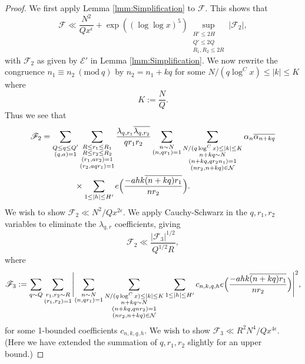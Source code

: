 \documentclass[10pt]{amsart}
\theoremstyle{plain}
\numberwithin{equation}{section}
\newcommand{\Mod}[1]{\ (\mathrm{mod}\ #1)}
\begin{document}
\begin{proof}
We first apply Lemma \ref{lmm:Simplification} to $\mathscr{F}$. This shows that
\[
\mathscr{F}\ll \frac{N^2}{Q x^\epsilon}+\exp((\log\log{x})^5)\sup_{\substack{H'\le 2H\\ Q'\le 2Q\\ R_1,R_2\le 2R}}|\mathscr{F}_2|,
\]
with $\mathscr{F}_2$ as given by $\mathscr{E}'$ in Lemma \ref{lmm:Simplification}. We now rewrite the congruence $n_1\equiv n_2\Mod{q}$ by $n_2=n_1+k q$ for some $N/(q\log^{C}{x})\le |k|\le K$ where 
\[
K:=\frac{N}{Q}.
\]
Thus we see that 
\begin{align*}
\mathscr{F}_2&=\sum_{\substack{Q\le q\le Q'\\ (q,a)=1}}\sum_{\substack{R\le r_1\le  R_1\\ R\le r_2\le R_2\\ (r_1,a r_2)=1\\ (r_2,a q r_1)=1}}\frac{\lambda_{q,r_1}\overline{\lambda_{q,r_2}}}{q r_1 r_2}\sum_{\substack{n\sim N\\ (n,qr_1)=1}}\sum_{\substack{N/(q\log^{C}{x})\le |k|\le K\\ n+k q\sim N\\ (n+k q,qr_2n_1)=1\\ (n r_2,n+k q)\in\mathcal{N}}}\alpha_{n}\overline{\alpha_{n+k q}}\\
&\qquad\qquad\times\sum_{1\le |h| \le H'} e\Bigl(\frac{- a h k\overline{(n+k q) r_1}}{n r_2}\Bigr).
\end{align*}
We wish to show $\mathscr{F}_2\ll N^2/Q x^{2\epsilon}$. We apply Cauchy-Schwarz in the $q,r_1,r_2$ variables to eliminate the $\lambda_{q,r}$ coefficients, giving
\[
\mathscr{F}_2\ll \frac{|\mathscr{F}_3|^{1/2}}{Q^{1/2} R},
\]
where
\begin{align*}
\mathscr{F}_3:=\sum_{q\sim Q}\sum_{\substack{r_1,r_2\sim R\\ (r_1,r_2)=1}}\Biggl|\sum_{\substack{n\sim N\\ (n,q r_1)=1}}\sum_{\substack{N/(q\log^{C}{x})\le |k|\le K\\ n+kq\sim N\\ (n+k q,q n r_2)=1\\ (n r_2,n+k q)\in\mathcal{N}}}\sum_{1\le |h| \le H'} c_{n,k,q,h} e\Bigl( \frac{-a h k\overline{(n+kq) r_1}}{ n r_2}\Bigr)\Biggr|^2,
\end{align*}
for some 1-bounded coefficients $c_{n,k,q,h}$. We wish to show $\mathscr{F}_3\ll R^2 N^4 /Q x^{4\epsilon}$. (Here we have extended the summation of $q,r_1,r_2$ slightly for an upper bound.)


\end{proof}
\end{document}
